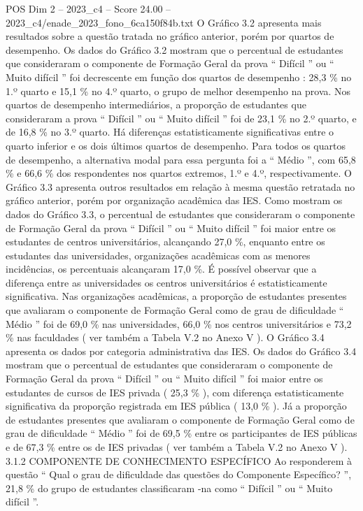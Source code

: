 \begin{textsample}{POS Dim 2 – 2023\_c4 – Score 24.00 – 2023\_c4/enade\_2023\_fono\_6ca150f84b.txt}
O Gráfico 3.2 apresenta mais resultados sobre a questão tratada no gráfico anterior, porém por quartos de desempenho.
Os dados do Gráfico 3.2 mostram que o percentual de estudantes que consideraram o componente de Formação Geral da prova “ Difícil ” ou “ Muito difícil ” foi decrescente em função dos quartos de desempenho : 28,3 \% no 1.º quarto e 15,1 \% no 4.º quarto, o grupo de melhor desempenho na prova.
Nos quartos de desempenho intermediários, a proporção de estudantes que consideraram a prova “ Difícil ” ou “ Muito difícil ” foi de 23,1 \% no 2.º quarto, e de 16,8 \% no 3.º quarto.
Há diferenças estatisticamente significativas entre o quarto inferior e os dois últimos quartos de desempenho.
Para todos os quartos de desempenho, a alternativa modal para essa pergunta foi a “ Médio ”, com 65,8 \% e 66,6 \% dos respondentes nos quartos extremos, 1.º e 4.º, respectivamente.
O Gráfico 3.3 apresenta outros resultados em relação à mesma questão retratada no gráfico anterior, porém por organização acadêmica das IES.
Como mostram os dados do Gráfico 3.3, o percentual de estudantes que consideraram o componente de Formação Geral da prova “ Difícil ” ou “ Muito difícil ” foi maior entre os estudantes de centros universitários, alcançando 27,0 \%, enquanto entre os estudantes das universidades, organizações acadêmicas com as menores incidências, os percentuais alcançaram 17,0 \%.
É possível observar que a diferença entre as universidades os centros universitários é estatisticamente significativa.
Nas organizações acadêmicas, a proporção de estudantes presentes que avaliaram o componente de Formação Geral como de grau de dificuldade “ Médio ” foi de 69,0 \% nas universidades, 66,0 \% nos centros universitários e 73,2 \% nas faculdades ( ver também a Tabela V.2 no Anexo V ).
O Gráfico 3.4 apresenta os dados por categoria administrativa das IES.
Os dados do Gráfico 3.4 mostram que o percentual de estudantes que consideraram o componente de Formação Geral da prova “ Difícil ” ou “ Muito difícil ” foi maior entre os estudantes de cursos de IES privada ( 25,3 \% ), com diferença estatisticamente significativa da proporção registrada em IES pública ( 13,0 \% ).
Já a proporção de estudantes presentes que avaliaram o componente de Formação Geral como de grau de dificuldade “ Médio ” foi de 69,5 \% entre os participantes de IES públicas e de 67,3 \% entre os de IES privadas ( ver também a Tabela V.2 no Anexo V ). 3.1.2 COMPONENTE DE CONHECIMENTO ESPECÍFICO Ao responderem à questão “ Qual o grau de dificuldade das questões do Componente Específico? ”, 21,8 \% do grupo de estudantes classificaram -na como “ Difícil ” ou “ Muito difícil ”.

\end{textsample}
